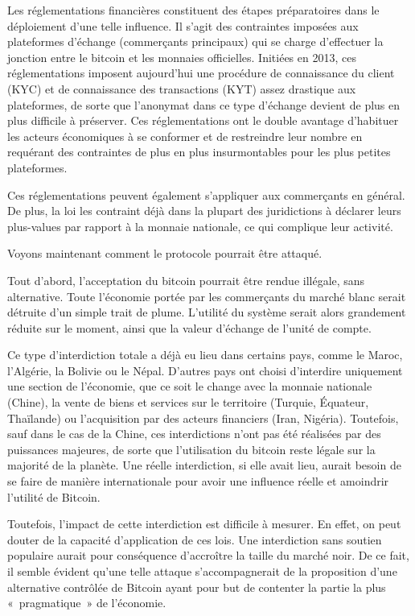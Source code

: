 Les réglementations financières constituent des étapes préparatoires dans le déploiement d'une telle influence. Il s'agit des contraintes imposées aux plateformes d'échange (commerçants principaux) qui se charge d'effectuer la jonction entre le bitcoin et les monnaies officielles. Initiées en 2013, ces réglementations imposent aujourd'hui une procédure de connaissance du client (KYC) et de connaissance des transactions (KYT) assez drastique aux plateformes, de sorte que l'anonymat dans ce type d'échange devient de plus en plus difficile à préserver. Ces réglementations ont le double avantage d'habituer les acteurs économiques à se conformer et de restreindre leur nombre en requérant des contraintes de plus en plus insurmontables pour les plus petites plateformes.

Ces réglementations peuvent également s'appliquer aux commerçants en général. De plus, la loi les contraint déjà dans la plupart des juridictions à déclarer leurs plus-values par rapport à la monnaie nationale, ce qui complique leur activité.

Voyons maintenant comment le protocole pourrait être attaqué.

Tout d'abord, l'acceptation du bitcoin pourrait être rendue illégale, sans alternative. Toute l'économie portée par les commerçants du marché blanc serait détruite d'un simple trait de plume. L'utilité du système serait alors grandement réduite sur le moment, ainsi que la valeur d'échange de l'unité de compte.

Ce type d'interdiction totale a déjà eu lieu dans certains pays, comme le Maroc, l'Algérie, la Bolivie ou le Népal. D'autres pays ont choisi d'interdire uniquement une section de l'économie, que ce soit le change avec la monnaie nationale (Chine), la vente de biens et services sur le territoire (Turquie, Équateur, Thaïlande) ou l'acquisition par des acteurs financiers (Iran, Nigéria). Toutefois, sauf dans le cas de la Chine, ces interdictions n'ont pas été réalisées par des puissances majeures, de sorte que l'utilisation du bitcoin reste légale sur la majorité de la planète. Une réelle interdiction, si elle avait lieu, aurait besoin de se faire de manière internationale pour avoir une influence réelle et amoindrir l'utilité de Bitcoin.

Toutefois, l'impact de cette interdiction est difficile à mesurer. En effet, on peut douter de la capacité d'application de ces lois. Une interdiction sans soutien populaire aurait pour conséquence d'accroître la taille du marché noir. De ce fait, il semble évident qu'une telle attaque s'accompagnerait de la proposition d'une alternative contrôlée de Bitcoin ayant pour but de contenter la partie la plus «~pragmatique~» de l'économie.

